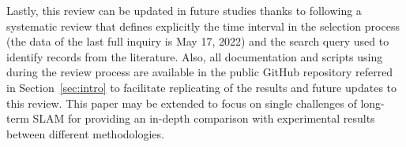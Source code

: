 Lastly, this review can be updated in future studies thanks to following a systematic review that defines explicitly the time interval in the selection process (the data of the last full inquiry is May 17, 2022) and the search query used to identify records from the literature.
Also, all documentation and scripts using during the review process are available in the public GitHub repository referred in Section~\ref{sec:intro} to facilitate replicating of the results and future updates to this review.
This paper may be extended to focus on single challenges of long-term SLAM for providing an in-depth comparison with experimental results between different methodologies.
